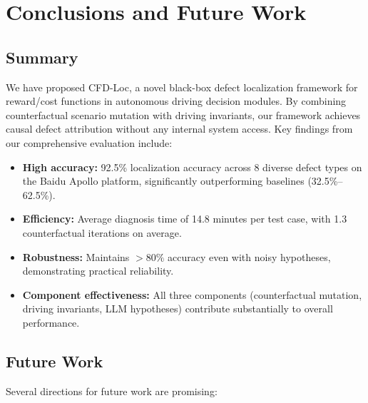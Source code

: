 \documentclass[conference]{IEEEtran}
\theoremstyle{plain}
\newcommand{\methodname}{CFD-Loc}
\begin{document}
\section{Conclusions and Future Work}
\label{sec:conclusion}

\subsection{Summary}

We have proposed \methodname, a novel black-box defect localization framework for reward/cost functions in autonomous driving decision modules. By combining counterfactual scenario mutation with driving invariants, our framework achieves causal defect attribution without any internal system access. Key findings from our comprehensive evaluation include:

\begin{itemize}[nosep]
    \item \textbf{High accuracy:} 92.5\% localization accuracy across 8 diverse defect types on the Baidu Apollo platform, significantly outperforming baselines (32.5\%--62.5\%).
    \item \textbf{Efficiency:} Average diagnosis time of 14.8 minutes per test case, with 1.3 counterfactual iterations on average.
    \item \textbf{Robustness:} Maintains $>80\%$ accuracy even with noisy hypotheses, demonstrating practical reliability.
    \item \textbf{Component effectiveness:} All three components (counterfactual mutation, driving invariants, LLM hypotheses) contribute substantially to overall performance.
\end{itemize}

\subsection{Future Work}

Several directions for future work are promising:
\end{document}
